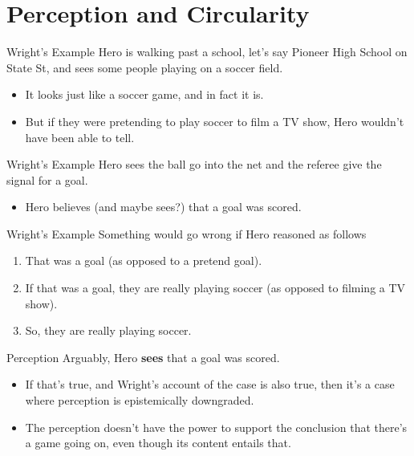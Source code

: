 \documentclass[
  17pt,
  letterpaper,
  ignorenonframetext,
  aspectratio=169,
  xcolor={dvipsnames}]{beamer}
\providecommand{\tightlist}{%
  \setlength{\itemsep}{0pt}\setlength{\parskip}{0pt}}\usepackage{longtable,booktabs,array}
\begin{document}
\hypertarget{perception-and-circularity}{%
\section{Perception and Circularity}\label{perception-and-circularity}}

\begin{frame}{Wright's Example}
\protect\hypertarget{wrights-example}{}
Hero is walking past a school, let's say Pioneer High School on State
St, and sees some people playing on a soccer field.

\begin{itemize}[<+->]
\tightlist
\item
  It looks just like a soccer game, and in fact it is.
\item
  But if they were pretending to play soccer to film a TV show, Hero
  wouldn't have been able to tell.
\end{itemize}
\end{frame}

\begin{frame}{Wright's Example}
\protect\hypertarget{wrights-example-1}{}
Hero sees the ball go into the net and the referee give the signal for a
goal.

\begin{itemize}[<+->]
\tightlist
\item
  Hero believes (and maybe sees?) that a goal was scored.
\end{itemize}
\end{frame}

\begin{frame}{Wright's Example}
\protect\hypertarget{wrights-example-2}{}
Something would go wrong if Hero reasoned as follows

\begin{enumerate}[<+->]
\tightlist
\item
  That was a goal (as opposed to a pretend goal).
\item
  If that was a goal, they are really playing soccer (as opposed to
  filming a TV show).
\item
  So, they are really playing soccer.
\end{enumerate}
\end{frame}

\begin{frame}{Perception}
\protect\hypertarget{perception}{}
Arguably, Hero \textbf{sees} that a goal was scored.

\begin{itemize}[<+->]
\tightlist
\item
  If that's true, and Wright's account of the case is also true, then
  it's a case where perception is epistemically downgraded.
\item
  The perception doesn't have the power to support the conclusion that
  there's a game going on, even though its content entails that.
\end{itemize}
\end{frame}
\end{document}
